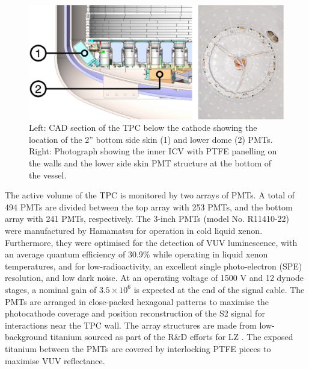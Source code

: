 {\begin{figure}[h!]
        \label{fig:tpc_diagram}
    \end{figure}
    \begin{figure}[h!]
        \centering
        \includegraphics[scale=0.77]{Chapter_2/Figures/Skin_detector.png}
        \caption[CAD diagram (left) showing the TPC below the cathode and a photograph (right), showing the PTFE panelling and the bottom skin PMT array.]%
        {Left: CAD section of the TPC below the cathode showing the location of the 2” bottom side skin (1) and lower dome (2) PMTs. Right: Photograph showing the inner ICV with PTFE panelling on the walls and the lower side skin PMT structure at the bottom of the vessel.}
        \label{fig:skin_detector_diagram}
    \end{figure}
}
%

The active volume of the TPC is monitored by two arrays of PMTs. A total of 494 PMTs are divided between the top array with 253 PMTs, and the bottom array with 241 PMTs, respectively. The 3-inch PMTs (model No. R11410-22) were manufactured by Hamamatsu for operation in cold liquid xenon. Furthermore, they were optimised for the detection of VUV luminescence, with an average quantum efficiency of 30.9\% while operating in liquid xenon temperatures, and for low-radioactivity, an excellent single photo-electron (SPE) resolution, and low dark noise. At an operating voltage of 1500 V and 12 dynode stages, a nominal gain of $3.5 \times 10^{6}$ is expected at the end of the signal cable. The PMTs are arranged in close-packed hexagonal patterns to maximise the photocathode coverage and position reconstruction of the S2 signal for interactions near the TPC wall. The array structures are made from low-background titanium sourced as part of the R\&D efforts for LZ \cite{LZ_titanium_selection}. The exposed titanium between the PMTs are covered by interlocking PTFE pieces to maximise VUV reflectance. 


